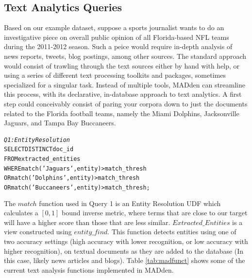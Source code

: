 \subsection{Text Analytics Queries}
Based on our example dataset, suppose a sports journalist
wants to do an investigative piece on overall public opinion 
of all Florida-based NFL teams during the 2011-2012 season. 
Such a peice would require in-depth analysis of news reports,
tweets, blog postings, among other sources. The standard approach would
consist of trawling through the text sources either by hand
with help, or using a series of different text processing
toolkits and packages, sometimes specialized for a singular 
task. Instead of multiple tools, MADden can streamline this process, with its
declarative, in-database approach to text analytics. A first step could 
conceivably consist of paring your corpora down to just
the documents related to the Florida football teams, namely
the Miami Dolphins, Jacksonville Jaguars, and Tampa Bay Buccaneers. 

\begin{small}
\begin{alltt}
\textit{Q1: Entity Resolution}
SELECT DISTINCT doc_id
FROM extracted_entities
WHERE match('Jaguars', entity) > match\_thresh
   OR match('Dolphins', entity) > match\_thresh
   OR match('Buccaneers', entity) > match\_thresh;
\end{alltt}
\end{small}

The $match$ function used in Query 1 is an Entity
Resolution UDF which calculates a $[0,1]$ bound inverse metric, where terms that
are close to our target will have a higher score than those that are less
similar. $Extracted\_Entities$ is a view constructed using $entity\_find$. 
This function detects entities using one of two accuracy settings
(high accuracy with lower recognition, or low accuracy with higher
recognition), on textual documents as they are added to the database 
(In this case, likely news articles and blogs). Table \ref{tab:madfunct} shows some of
the current text analysis functions implemented in MADden. \\

